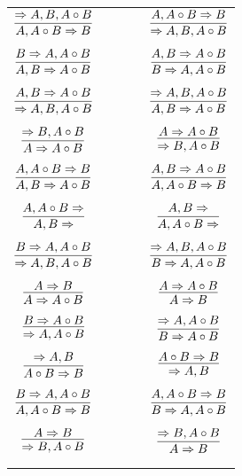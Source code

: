 \documentclass[11pt]{article}
\begin{document}
\begin{center}
\begin{tabular}{ccc}
$\infer{A, A\circ B\Rightarrow B}{\Rightarrow A, B, A\circ B}$	&& $\infer{\Rightarrow A, B, A\circ B}{A, A\circ B\Rightarrow B}$ \\
	&& \\
$\infer{A, B\Rightarrow A\circ B}{B\Rightarrow A, A\circ B}$	&& $\infer{B\Rightarrow A, A\circ B}{A, B\Rightarrow A\circ B}$ \\
	&& \\
$\infer{\Rightarrow A, B, A\circ B}{A, B\Rightarrow A\circ B}$	&& $\infer{A, B\Rightarrow A\circ B}{\Rightarrow A, B, A\circ B}$ \\
	&& \\
$\infer{A\Rightarrow A\circ B}{\Rightarrow B, A\circ B}$	&& $\infer{\Rightarrow B, A\circ B}{A\Rightarrow A\circ B}$ \\
	&& \\
$\infer{A, B\Rightarrow A\circ B}{A, A\circ B\Rightarrow B}$	&& $\infer{A, A\circ B\Rightarrow B}{A, B\Rightarrow A\circ B}$ \\
	&& \\
$\infer{A, B\Rightarrow }{A, A\circ B\Rightarrow }$	& \ \ \ \ & $\infer{A, A\circ B\Rightarrow }{A, B\Rightarrow }$ \\
	&& \\
$\infer{\Rightarrow A, B, A\circ B}{B\Rightarrow A, A\circ B}$	&& $\infer{B\Rightarrow A, A\circ B}{\Rightarrow A, B, A\circ B}$ \\
	&& \\
$\infer{A\Rightarrow A\circ B}{A\Rightarrow B}$	&& $\infer{A\Rightarrow B}{A\Rightarrow A\circ B}$ \\
	&& \\
$\infer{\Rightarrow A, A\circ B}{B\Rightarrow A\circ B}$	&& $\infer{B\Rightarrow A\circ B}{\Rightarrow A, A\circ B}$ \\
	&& \\
$\infer{A\circ B\Rightarrow B}{\Rightarrow A, B}$	&& $\infer{\Rightarrow A, B}{A\circ B\Rightarrow B}$ \\
	&& \\
$\infer{A, A\circ B\Rightarrow B}{B\Rightarrow A, A\circ B}$	&& $\infer{B\Rightarrow A, A\circ B}{A, A\circ B\Rightarrow B}$ \\
	&& \\
$\infer{\Rightarrow B, A\circ B}{A\Rightarrow B}$	&& $\infer{A\Rightarrow B}{\Rightarrow B, A\circ B}$ \\
	&& \\
	&& \\

\end{tabular}
\end{center}
\end{document}

